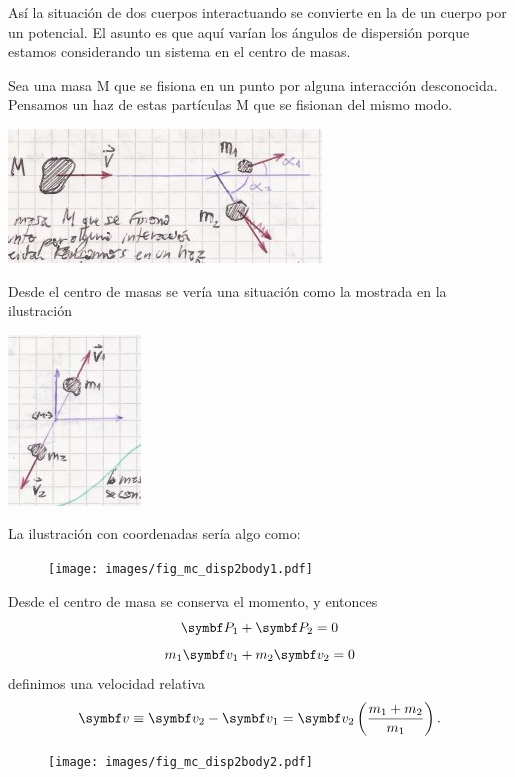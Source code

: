 \documentclass[10pt,oneside]{CBFT_book}
\begin{document}
Así la situación de dos cuerpos interactuando se convierte en la de un cuerpo por un potencial.
El asunto es que aquí varían los ángulos de dispersión porque estamos considerando un sistema
en el centro de masas.

Sea una masa M que se fisiona en un punto por alguna interacción desconocida. Pensamos un haz de
estas partículas M que se fisionan del mismo modo.

\includegraphics[scale=0.3]{images/fig_mc_dispersion_2cuerpos1.jpg}

Desde el centro de masas se vería una situación como la mostrada en la ilustración

\includegraphics[scale=0.3]{images/fig_mc_dispersion_2cuerpos2.jpg}

La ilustración con coordenadas sería algo como:
\begin{figure}[htb]
	\begin{center}
	\texttt{[image: images/fig\_mc\_disp2body1.pdf]}	 
	\end{center}
	\caption{}
\end{figure} 

Desde el centro de masa se conserva el momento, y entonces
\[
	\vb{P}_1 + \vb{P}_2 = 0
\]
\[
	m_1 \vb{v}_1 + m_2 \vb{v}_2 = 0
\]
definimos una velocidad relativa
\[
	\vb{v} \equiv \vb{v}_2  - \vb{v}_1 = \vb{v}_2 \left( \frac{ m_1 + m_2 }{ m_1 }\right) .
\]
\begin{figure}[htb]
	\begin{center}
	\texttt{[image: images/fig\_mc\_disp2body2.pdf]}	 
	\end{center}
	\caption{}
\end{figure} 
\end{document}
